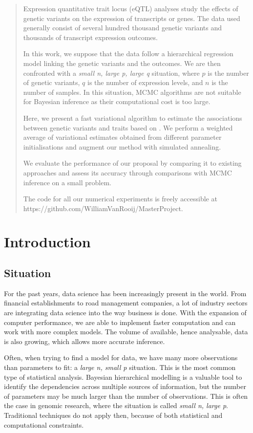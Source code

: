 \documentclass[a4paper, 11pt]{report}
\numberwithin{equation}{chapter}
\begin{document}
\newpage
\begin{abstract}
Expression quantitative trait locus (eQTL) analyses study the effects of genetic variants on the expression of transcripts or genes. The data used generally consist of several hundred thousand genetic variants and thousands of transcript expression outcomes. 

In this work, we suppose that the data follow a hierarchical regression model linking the genetic variants and the outcomes. We are then confronted with a \textit{small n, large p, large q} situation, where $p$ is the number of genetic variants, $q$ is the number of expression levels, and $n$ is the number of samples. In this situation, MCMC algorithms are not suitable for Bayesian inference as their computational cost is too large. 

Here, we present a fast variational algorithm to estimate the associations between genetic variants and traits based on \citet{eff_inf}. We perform a weighted average of variational estimates obtained from different parameter initialisations and augment our method with simulated annealing.

We evaluate the performance of our proposal by comparing it to existing approaches and assess its accuracy through comparisons with MCMC inference on a small problem.

The code for all our numerical experiments is freely accessible at \\
https://github.com/WilliamVanRooij/MasterProject.
\end{abstract}
\tableofcontents
\newpage
\chapter{Introduction}
\section{Situation}
For the past years, data science has been increasingly present in the world. From financial establishments to road management companies, a lot of industry sectors are integrating data science into the way business is done. With the expansion of computer performance, we are able to implement faster computation and can work with more complex models. The volume of available, hence analysable, data is also growing, which allows more accurate inference.

Often, when trying to find a model for data, we have many more observations than parameters to fit: a \textit{large n, small p} situation. This is the most common type of statistical analysis. Bayesian hierarchical modelling is a valuable tool to identify the dependencies across multiple sources of information, but the number of parameters may be much larger than the number of observations. This is often the case in genomic research, where the situation is called \textit{small n, large p}. Traditional techniques do not apply then, because of both statistical and computational constraints.
\end{document}
